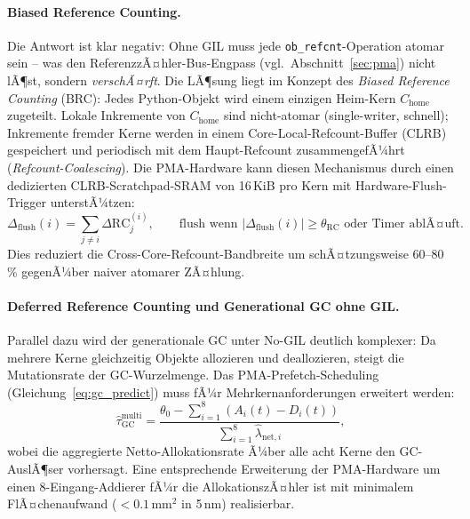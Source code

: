 ﻿\documentclass[a4paper,12pt]{scrreprt}
\theoremstyle{definition}
\begin{document}
	\paragraph{Biased Reference Counting.}
	Die Antwort ist klar negativ: Ohne GIL muss jede \texttt{ob\_refcnt}-Operation
	atomar sein -- was den ReferenzzÃ¤hler-Bus-Engpass (vgl.\ Abschnitt~\ref{sec:pma})
	nicht lÃ¶st, sondern\emph{ verschÃ¤rft}. Die LÃ¶sung liegt im Konzept des
	\emph{Biased Reference Counting} (BRC): Jedes Python-Objekt wird einem
	einzigen Heim-Kern $C_{\mathrm{home}}$ zugeteilt. Lokale Inkremente von
	$C_{\mathrm{home}}$ sind nicht-atomar (single-writer, schnell); Inkremente
	fremder Kerne werden in einem Core-Local-Refcount-Buffer (CLRB) gespeichert
	und periodisch mit dem Haupt-Refcount zusammengefÃ¼hrt (\emph{Refcount-Coalescing}).
	Die PMA-Hardware kann diesen Mechanismus durch einen dedizierten
	CLRB-Scratchpad-SRAM von 16\,KiB pro Kern mit Hardware-Flush-Trigger unterstÃ¼tzen:
	\begin{equation}
		\Delta_{\mathrm{flush}}(i) = \sum_{j \ne i} \Delta \mathrm{RC}_j^{(i)},
		\qquad
		\text{flush wenn } |\Delta_{\mathrm{flush}}(i)| \ge \theta_{\mathrm{RC}}
		\text{ oder Timer ablÃ¤uft.}
		\label{eq:brc_flush}
	\end{equation}
	Dies reduziert die Cross-Core-Refcount-Bandbreite um schÃ¤tzungsweise 60--80\,\%
	gegenÃ¼ber naiver atomarer ZÃ¤hlung.

	\paragraph{Deferred Reference Counting und Generational GC ohne GIL.}
	Parallel dazu wird der generationale GC unter No-GIL deutlich komplexer:
	Da mehrere Kerne gleichzeitig Objekte allozieren und deallozieren, steigt
	die Mutationsrate der GC-Wurzelmenge. Das PMA-Prefetch-Scheduling
	(Gleichung~\eqref{eq:gc_predict}) muss fÃ¼r Mehrkernanforderungen erweitert werden:
	\begin{equation}
		\hat\tau_{\mathrm{GC}}^{\mathrm{multi}} =
		\frac{\theta_0 - \sum_{i=1}^{8} (A_i(t) - D_i(t))}
		{\sum_{i=1}^{8} \hat\lambda_{\mathrm{net},i}},
		\label{eq:gc_predict_multi}
	\end{equation}
	wobei die aggregierte Netto-Allokationsrate Ã¼ber alle acht Kerne den
	GC-AuslÃ¶ser vorhersagt. Eine entsprechende Erweiterung der PMA-Hardware um
	einen 8-Eingang-Addierer fÃ¼r die AllokationszÃ¤hler ist mit minimalem
	FlÃ¤chenaufwand ($<\!0.1\,\mathrm{mm}^2$ in 5\,nm) realisierbar.
\end{document}
